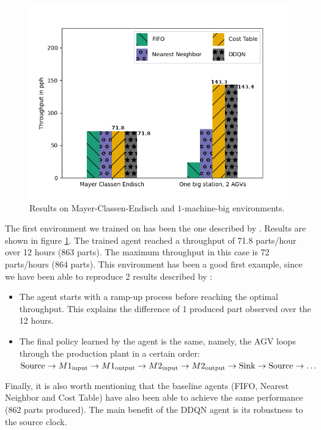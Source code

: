 \documentclass[sn-mathphys]{sn-jnl}
\begin{document}
\begin{figure}[ht]
  \includegraphics[width=1.0\textwidth]{results_simple_cases.png}
  \caption{Results on Mayer-Classen-Endisch and $1$-machine-big environments.}
  \label{fig:simple_cases_results}
\end{figure}

The first environment we trained on has been the one described by \cite{Mayer2021}. Results are shown in figure \ref{fig:simple_cases_results}. The trained agent reached a throughput of 71.8 parts/hour over 12 hours (863 parts). The maximum throughput in this case is 72 parts/hours (864 parts). This environment has been a good first example, since we have been able to reproduce 2 results described by \cite{Mayer2021}:
\begin{itemize}
    \item The agent starts with a ramp-up process before reaching the optimal throughput. This explains the difference of 1 produced part observed over the 12 hours.
    \item The final policy learned by the agent is the same, namely, the AGV loops through the production plant in a certain order: $\text{Source} \rightarrow M1_{\rm input} \rightarrow M1_{\rm output} \rightarrow M2_{\rm input} \rightarrow M2_{\rm  output} \rightarrow \text{Sink} \rightarrow \text{Source} \rightarrow \ldots$
\end{itemize}

Finally, it is also worth mentioning that the baseline agents (FIFO, Nearest Neighbor and Cost Table) have also been able to achieve the same performance (862 parts produced). The main benefit of the DDQN agent is its robustness to the source clock.
\end{document}
